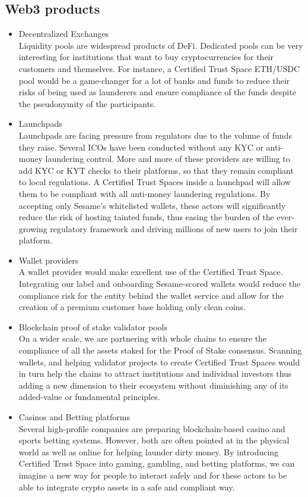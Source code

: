 ﻿\documentclass[a4paper]{article}
\let\OldTexttrademark\texttrademark
\renewcommand{\texttrademark}{\OldTexttrademark\xspace}%
\newcommand{\smallvspace}{\vspace{4pt} \\}
\begin{document}
\subsection{Web3 products}
\begin{itemize} 
\item Decentralized Exchanges \smallvspace
Liquidity pools are widespread products of DeFi. Dedicated pools can be very interesting for institutions that want to buy cryptocurrencies for their customers and themselves. For instance, a Certified Trust Space\texttrademark ETH/USDC pool would be a game-changer for a lot of banks and funds to reduce their risks of being used as launderers and ensure compliance of the funds despite the pseudonymity of the participants.

\item 
Launchpads \smallvspace
Launchpads are facing pressure from regulators due to the volume of funds they raise. Several ICOs have been conducted without any KYC or anti-money laundering control. More and more of these providers are willing to add KYC or KYT checks to their platforms, so that they remain compliant to local regulations. A Certified Trust Spaces\texttrademark inside a launchpad will allow them to be compliant with all anti-money laundering regulations. By accepting only Sesame’s whitelisted wallets, these actors will significantly reduce the risk of hosting tainted funds, thus easing the burden of the ever-growing regulatory framework and driving millions of new users to join their platform.

\item 
Wallet providers \smallvspace
A wallet provider would make excellent use of the Certified Trust Space\OldTexttrademark. Integrating our label and onboarding Sesame-scored wallets would reduce the compliance risk for the entity behind the wallet service and allow for the creation of a premium customer base holding only clean coins.

\item 
Blockchain proof of stake validator pools \smallvspace
On a wider scale, we are partnering with whole chains to ensure the compliance of all the assets staked for the Proof of Stake consensus. Scanning wallets, and helping validator projects to create Certified Trust Spaces\texttrademark would in turn help the chains to attract institutions and individual investors thus adding a new dimension to their ecosystem without diminishing any of its added-value or fundamental principles.

\item 
Casinos and Betting platforms \smallvspace
Several high-profile companies are preparing blockchain-based casino and sports betting systems. However, both are often pointed at in the physical world as well as online for helping launder dirty money. By introducing Certified Trust Space\texttrademark into gaming, gambling, and betting platforms, we can imagine a new way for people to interact safely and for these actors to be able to integrate crypto assets in a safe and compliant way.


\end{itemize}
\end{document}
